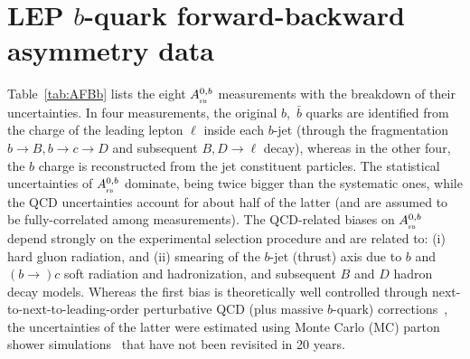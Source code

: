 \documentclass{moriond}
\newcommand{\AFBb}  {A_{_{\textsc{fb}}}^{0,b}}
\begin{document}
\section{LEP $b$-quark forward-backward asymmetry data}
\label{sec:}

Table~\ref{tab:AFBb} lists the eight $\AFBb$ measurements with the breakdown of their uncertainties.
In four measurements, the original $b$,~$\bar{b}$ quarks are identified from the charge of the leading 
lepton $\ell$ inside each $b$-jet (through the fragmentation $b\to B, b\to c\to D$ and subsequent 
$B,D\to\ell$ decay), whereas in the other four, the $b$ charge is reconstructed from 
the jet constituent particles.
The statistical uncertainties of $\AFBb$ dominate, being twice bigger than the systematic ones, while the 
QCD uncertainties account for about half of the latter (and are assumed to be fully-correlated among measurements). 
The QCD-related biases on $\AFBb$ depend strongly on the experimental selection procedure and are related to: (i) hard gluon radiation, and
(ii) smearing of the $b$-jet (thrust) axis due to $b$ and $(b\to)c$ soft radiation and hadronization,
and subsequent $B$ and $D$ hadron decay models. Whereas the first bias is theoretically well controlled
through next-to-next-to-leading-order perturbative QCD (plus massive $b$-quark) corrections~\cite{Bernreuther:2016ccf}, 
the uncertainties of the latter were estimated using Monte Carlo (MC) parton shower 
simulations~\cite{Abbaneo:1998xt} that have not been revisited in 20 years.
\end{document}

